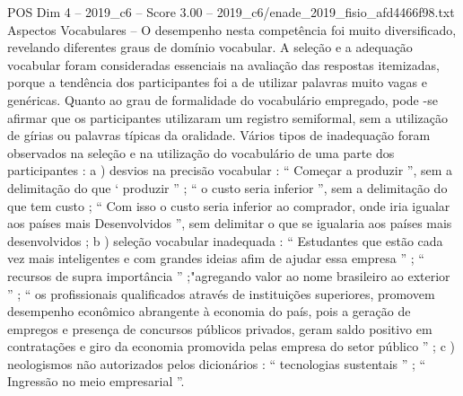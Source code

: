 \begin{textsample}{POS Dim 4 – 2019\_c6 – Score 3.00 – 2019\_c6/enade\_2019\_fisio\_afd4466f98.txt}
Aspectos Vocabulares – O desempenho nesta competência foi muito diversificado, revelando diferentes graus de domínio vocabular.
A seleção e a adequação vocabular foram consideradas essenciais na avaliação das respostas itemizadas, porque a tendência dos participantes foi a de utilizar palavras muito vagas e genéricas.
Quanto ao grau de formalidade do vocabulário empregado, pode -se afirmar que os participantes utilizaram um registro semiformal, sem a utilização de gírias ou palavras típicas da oralidade.
Vários tipos de inadequação foram observados na seleção e na utilização do vocabulário de uma parte dos participantes : a ) desvios na precisão vocabular : “ Começar a produzir ”, sem a delimitação do que ‘ produzir ” ; “ o custo seria inferior ”, sem a delimitação do que tem custo ; “ Com isso o custo seria inferior ao comprador, onde iria igualar aos países mais Desenvolvidos ”, sem delimitar o que se igualaria aos países mais desenvolvidos ; b ) seleção vocabular inadequada : “ Estudantes que estão cada vez mais inteligentes e com grandes ideias afim de ajudar essa empresa ” ; “ recursos de supra importância ” ;"agregando valor ao nome brasileiro ao exterior ” ; “ os profissionais qualificados através de instituições superiores, promovem desempenho econômico abrangente à economia do país, pois a geração de empregos e presença de concursos públicos privados, geram saldo positivo em contratações e giro da economia promovida pelas empresa do setor público ” ; c ) neologismos não autorizados pelos dicionários : “ tecnologias sustentais ” ; “ Ingressão no meio empresarial ”.

\end{textsample}
